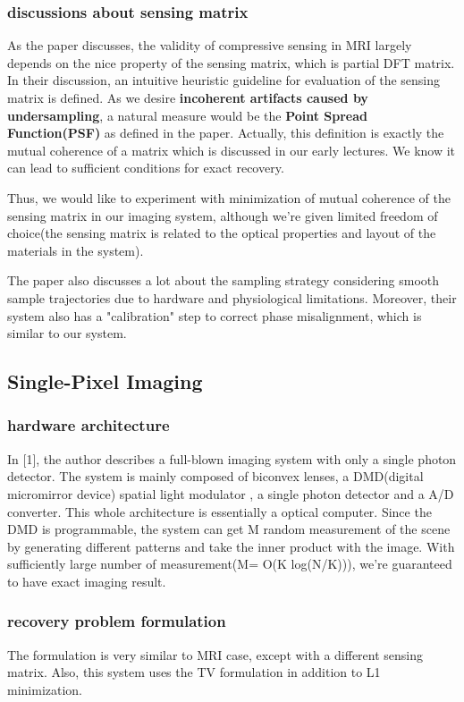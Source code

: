 \documentclass{article} %
\begin{document}
\subsubsection{discussions about sensing matrix}
As the paper discusses, the validity of compressive sensing in MRI largely depends on the nice property of the sensing matrix, which is partial DFT matrix. In their discussion, an intuitive heuristic guideline for evaluation of the sensing matrix is defined. As we desire \textbf{incoherent artifacts caused by undersampling}, a natural measure would be the \textbf{Point Spread Function(PSF)} as defined in the paper. Actually, this definition is exactly the mutual coherence of a matrix which is discussed in our early lectures. We know it can lead to sufficient conditions for exact recovery. 

Thus, we would like to experiment with minimization of mutual coherence of the sensing matrix in our imaging system, although we're given limited freedom of choice(the sensing matrix is related to the optical properties and layout of the materials in the system).

The paper also discusses a lot about the sampling strategy considering smooth sample trajectories due to hardware and physiological limitations. Moreover, their system also has a "calibration" step to correct phase misalignment, which is similar to our system.

\subsection{Single-Pixel Imaging}
\subsubsection{hardware architecture}
In [1], the author describes a full-blown imaging system with only a single photon detector.  The system is mainly composed of biconvex lenses, a DMD(digital micromirror device) spatial light modulator , a single photon detector and a A/D converter. This whole architecture is essentially a optical computer. Since the DMD is programmable, the system can get M random measurement of the scene by generating different patterns and take the inner product with the image. With sufficiently large number of measurement(M= O(K log(N/K))), we're guaranteed to have exact imaging result. 
\subsubsection{recovery problem formulation}
The formulation is very similar to MRI case, except with a different sensing matrix. Also, this system uses the TV formulation in addition to L1 minimization.
\end{document}
